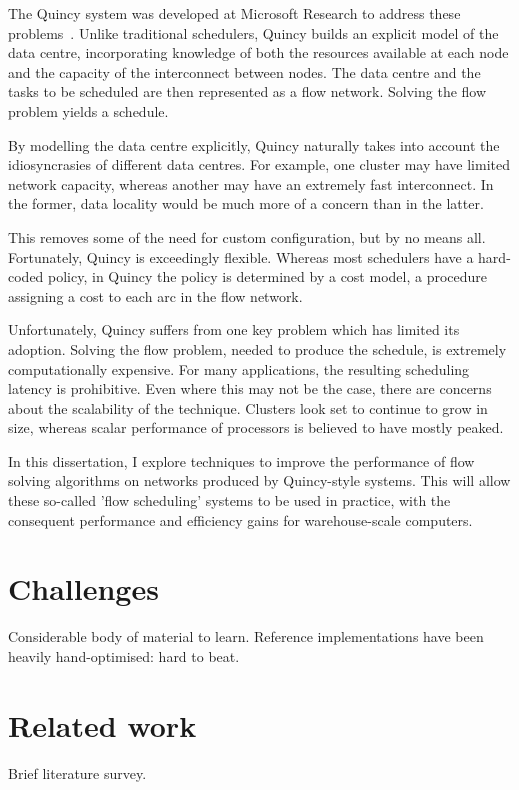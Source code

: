 


The Quincy system was developed at Microsoft Research to address these problems~\cite{Isard:2009}. Unlike traditional schedulers, Quincy builds an explicit model of the data centre, incorporating knowledge of both the resources available at each node and the capacity of the interconnect between nodes. The data centre and the tasks to be scheduled are then represented as a flow network. Solving the flow problem yields a schedule.

By modelling the data centre explicitly, Quincy naturally takes into account the idiosyncrasies of different data centres. For example, one cluster may have limited network capacity, whereas another may have an extremely fast interconnect. In the former, data locality would be much more of a concern than in the latter.

This removes some of the need for custom configuration, but by no means all. Fortunately, Quincy is exceedingly flexible. Whereas most schedulers have a hard-coded policy, in Quincy the policy is determined by a cost model, a procedure assigning a cost to each arc in the flow network.

Unfortunately, Quincy suffers from one key problem which has limited its adoption. Solving the flow problem, needed to produce the schedule, is extremely computationally expensive.  For many applications, the resulting scheduling latency is prohibitive. Even where this may not be the case, there are concerns about the scalability of the technique. Clusters look set to continue to grow in size, whereas scalar performance of processors is believed to have mostly peaked.

In this dissertation, I explore techniques to improve the performance of flow solving algorithms on networks produced by Quincy-style systems. This will allow these so-called 'flow scheduling' systems to be used in practice, with the consequent performance and efficiency gains for warehouse-scale computers.

\section{Challenges} \label{sec:intro-challenges}
Considerable body of material to learn. Reference implementations have been heavily hand-optimised: hard to beat. 

\section{Related work} \label{sec:intro-related-work}
Brief literature survey.
